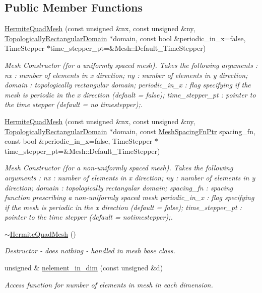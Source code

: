 \subsection*{Public Member Functions}
\begin{DoxyCompactItemize}
\item 
\hyperlink{classoomph_1_1HermiteQuadMesh_aea2e2144668d092f4e358f195bbc74e7}{Hermite\+Quad\+Mesh} (const unsigned \&nx, const unsigned \&ny, \hyperlink{classoomph_1_1TopologicallyRectangularDomain}{Topologically\+Rectangular\+Domain} $\ast$domain, const bool \&periodic\+\_\+in\+\_\+x=false, Time\+Stepper $\ast$time\+\_\+stepper\+\_\+pt=\&Mesh\+::\+Default\+\_\+\+Time\+Stepper)
\begin{DoxyCompactList}\small\item\em Mesh Constructor (for a uniformly spaced mesh). Takes the following arguments \+: nx \+: number of elements in x direction; ny \+: number of elements in y direction; domain \+: topologically rectangular domain; periodic\+\_\+in\+\_\+x \+: flag specifying if the mesh is periodic in the x direction (default = false); time\+\_\+stepper\+\_\+pt \+: pointer to the time stepper (default = no timestepper);. \end{DoxyCompactList}\item 
\hyperlink{classoomph_1_1HermiteQuadMesh_ae28d471336aebafc5fe5e9f303ab0ad8}{Hermite\+Quad\+Mesh} (const unsigned \&nx, const unsigned \&ny, \hyperlink{classoomph_1_1TopologicallyRectangularDomain}{Topologically\+Rectangular\+Domain} $\ast$domain, const \hyperlink{classoomph_1_1HermiteQuadMesh_abebf4806b300591f976398404ed0ef3f}{Mesh\+Spacing\+Fn\+Ptr} spacing\+\_\+fn, const bool \&periodic\+\_\+in\+\_\+x=false, Time\+Stepper $\ast$time\+\_\+stepper\+\_\+pt=\&Mesh\+::\+Default\+\_\+\+Time\+Stepper)
\begin{DoxyCompactList}\small\item\em Mesh Constructor (for a non-\/uniformly spaced mesh). Takes the following arguments \+: nx \+: number of elements in x direction; ny \+: number of elements in y direction; domain \+: topologically rectangular domain; spacing\+\_\+fn \+: spacing function prescribing a non-\/uniformly spaced mesh periodic\+\_\+in\+\_\+x \+: flag specifying if the mesh is periodic in the x direction (default = false); time\+\_\+stepper\+\_\+pt \+: pointer to the time stepper (default = notimestepper);. \end{DoxyCompactList}\item 
\hyperlink{classoomph_1_1HermiteQuadMesh_a81f14d729df268911cd3943efc125492}{$\sim$\+Hermite\+Quad\+Mesh} ()
\begin{DoxyCompactList}\small\item\em Destructor -\/ does nothing -\/ handled in mesh base class. \end{DoxyCompactList}\item 
unsigned \& \hyperlink{classoomph_1_1HermiteQuadMesh_a06599366634a9ac89e25a0f110d0a35b}{nelement\+\_\+in\+\_\+dim} (const unsigned \&d)
\begin{DoxyCompactList}\small\item\em Access function for number of elements in mesh in each dimension. \end{DoxyCompactList}\end{DoxyCompactItemize}
